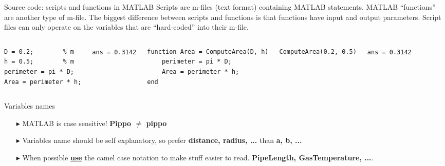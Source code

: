 \documentclass[aspectratio=169]{beamer}
\begin{document}
\begin{frame}[fragile]{Source code: scripts and functions in MATLAB}
    Scripts are m-files (text format) containing MATLAB statements. MATLAB ``functions'' are another type of m-file. The biggest difference between scripts and functions is that functions have input and output parameters. Script files can only operate on the variables that are ``hard-coded'' into their m-file.

    \begin{columns}[T]
    \begin{verbatim}
D = 0.2;        % m
h = 0.5;        % m
perimeter = pi * D;
Area = perimeter * h;
    \end{verbatim}
    \vspace{2mm}
    \texttt{ans = 0.3142}
    
    \begin{verbatim}
function Area = ComputeArea(D, h)
    perimeter = pi * D;
    Area = perimeter * h;
end
    \end{verbatim}
    \vspace{2mm}
    \begin{verbatim}
ComputeArea(0.2, 0.5)
    \end{verbatim}
    \texttt{ans = 0.3142}
\end{columns}
\end{frame}

\begin{frame}{Variables names}
    \begin{itemize}
        \item[$\blacktriangleright$]
        MATLAB is case sensitive! \textbf{Pippo $\neq$ pippo}

        \item[$\blacktriangleright$]
        Variables name should be self explanatory, so prefer \textbf{distance, radius, ...} than \textbf{a, b, ...}

        \item[$\blacktriangleright$]
        When possible \underline{\textbf{use}} the camel case notation to make stuff easier to read. \textbf{PipeLength, GasTemperature, ...}.
    \end{itemize}
\end{frame}
 
\end{document}
